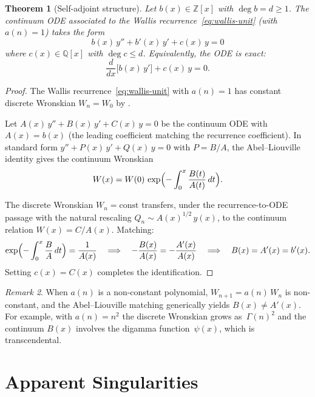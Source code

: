 \documentclass[11pt,a4paper]{amsart}
\theoremstyle{plain}
\newtheorem{theorem}{Theorem}[section]
\theoremstyle{definition}
\theoremstyle{remark}
\newtheorem{remark}[theorem]{Remark}
\newcommand{\Z}{\mathbb{Z}}
\newcommand{\Q}{\mathbb{Q}}
\begin{document}
\begin{theorem}[Self-adjoint structure]\label{thm:self-adjoint}
Let $b(x)\in\Z[x]$ with $\deg b = d \ge 1$.  The continuum ODE
associated to the Wallis recurrence~\eqref{eq:wallis-unit} (with
$a(n)=1$) takes the form
\begin{equation}\label{eq:exact-ode}
  b(x)\,y'' + b'(x)\,y' + c(x)\,y = 0
\end{equation}
where $c(x)\in\Q[x]$ with $\deg c \le d$.
Equivalently, the ODE is exact:
\[
  \frac{d}{dx}\bigl[b(x)\,y'\bigr] + c(x)\,y = 0.
\]
\end{theorem}

\begin{proof}
The Wallis recurrence~\eqref{eq:wallis-unit} with $a(n)=1$ has
constant discrete Wronskian $W_n = W_0$ by .

Let $A(x)\,y'' + B(x)\,y' + C(x)\,y = 0$ be the continuum ODE
with $A(x) = b(x)$ (the leading coefficient matching the recurrence
coefficient).  In standard form $y'' + P(x)\,y' + Q(x)\,y = 0$
with $P = B/A$, the Abel--Liouville identity gives the continuum
Wronskian
\[
  W(x) = W(0)\,\exp\Bigl(-\int_0^x \frac{B(t)}{A(t)}\,dt\Bigr).
\]

The discrete Wronskian $W_n = \text{const}$ transfers, under the
recurrence-to-ODE passage with the natural rescaling
$Q_n \sim A(x)^{1/2}\,y(x)$, to the continuum relation
$W(x) = C/A(x)$.  Matching:
\[
  \exp\Bigl(-\int_0^x \frac{B}{A}\,dt\Bigr) = \frac{1}{A(x)}
  \quad\Longrightarrow\quad
  -\frac{B(x)}{A(x)} = -\frac{A'(x)}{A(x)}
  \quad\Longrightarrow\quad
  B(x) = A'(x) = b'(x).
\]
Setting $c(x) = C(x)$ completes the identification.
\end{proof}

\begin{remark}\label{rem:non-constant-a}
When $a(n)$ is a non-constant polynomial, $W_{n+1} = a(n)\,W_n$
is non-constant, and the Abel--Liouville matching generically yields
$B(x) \ne A'(x)$.  For example, with $a(n)=n^2$ the discrete
Wronskian grows as~$\Gamma(n)^2$ and the continuum $B(x)$ involves
the digamma function~$\psi(x)$, which is transcendental.
\end{remark}

\section{Apparent Singularities}\label{sec:apparent}
\end{document}
